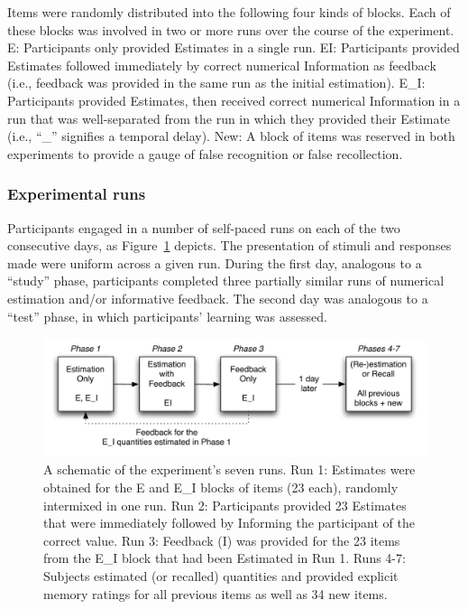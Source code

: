 Items were randomly distributed into the following four kinds of blocks. Each of
these blocks was involved in two or more runs over the course of the experiment.
E: Participants only provided Estimates in a single run. EI: Participants
provided Estimates followed immediately by correct numerical Information as
feedback (i.e., feedback was provided in the same run as the initial
estimation). E_I: Participants provided Estimates, then received correct
numerical Information in a run that was well-separated from the run in which
they provided their Estimate (i.e., ``_'' signifies a temporal delay). New: A
block of items was reserved in both experiments to provide a gauge of false
recognition or false recollection.

\subsubsection{Experimental runs}

Participants engaged in a number of self-paced runs on each of the two
consecutive days, as Figure~\ref{ei-procedure} depicts. The presentation of
stimuli and responses made were uniform across a given run. During the first
day, analogous to a ``study'' phase, participants completed three partially
similar runs of numerical estimation and/or informative feedback. The second day
was analogous to a ``test'' phase, in which participants’ learning was assessed.

 
\begin{figure}[h]
\includegraphics[width=\textwidth]{Experiment1-procedure.pdf}
\caption{A schematic of the experiment's seven runs. Run 1:
Estimates were obtained for the E and E\_I blocks of items (23 each), randomly
intermixed in one run. Run 2: Participants provided 23 Estimates that were
immediately followed by Informing the participant of the correct value. Run 3:
Feedback (I) was provided for the 23 items from the E\_I block that had been
Estimated in Run 1. Runs 4-7: Subjects estimated (or recalled) quantities and
provided explicit memory ratings for all previous items as well as 34 new
items.}
\label{ei-procedure} 
\end{figure}

